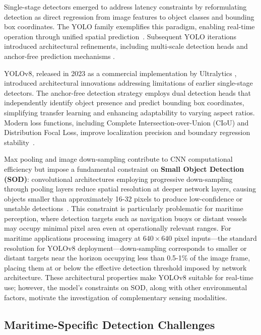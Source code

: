 \documentclass[../main.tex]{subfiles}
\begin{document}
Single-stage detectors emerged to address latency constraints by reformulating detection as direct regression from image features to object classes and bounding box coordinates.
The YOLO family exemplifies this paradigm, enabling real-time operation through unified spatial prediction~\cite{redmon2016}.
Subsequent YOLO iterations introduced architectural refinements, including multi-scale detection heads and anchor-free prediction mechanisms \cite{terven2023}.

YOLOv8, released in 2023 as a commercial implementation by Ultralytics \cite{ultralytics}, introduced architectural innovations addressing limitations of earlier single-stage detectors.
The anchor-free detection strategy employs dual detection heads that independently identify object presence and predict bounding box coordinates, simplifying transfer learning and enhancing adaptability to varying aspect ratios.
Modern loss functions, including Complete Intersection-over-Union (CIoU) and Distribution Focal Loss, improve localization precision and boundary regression stability~\cite{redmon2016}.

Max pooling and image down-sampling contribute to CNN computational efficiency but impose a fundamental constraint on \textbf{Small Object Detection (SOD)}: convolutional architectures employing progressive down-sampling through pooling layers reduce spatial resolution at deeper network layers, causing objects smaller than approximately 16-32 pixels to produce low-confidence or unstable detections~\cite{rekavandi2022}.
This constraint is particularly problematic for maritime perception, where detection targets such as navigation buoys or distant vessels may occupy minimal pixel area even at operationally relevant ranges.
For maritime applications processing imagery at $640 \times 640$ pixel inputs---the standard resolution for YOLOv8 deployment---down-sampling corresponds to smaller or distant targets near the horizon occupying less than 0.5-1\% of the image frame, placing them at or below the effective detection threshold imposed by network architecture.
These architectural properties make YOLOv8 suitable for real-time use; however, the model's constraints on SOD, along with other environmental factors, motivate the investigation of complementary sensing modalities.

\subsection{Maritime-Specific Detection Challenges}
\end{document}
